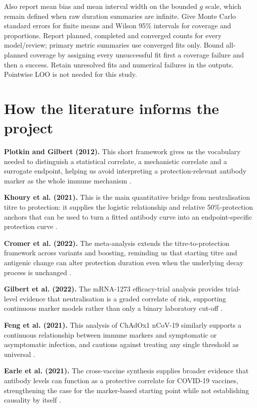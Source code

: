 \documentclass[11pt,a4paper]{article}
\begin{document}
Also report mean bias and mean interval width on the bounded $g$ scale,
which remain defined when raw duration summaries are infinite. Give Monte
Carlo standard errors for finite means and Wilson 95\% intervals for
coverage and proportions. Report planned, completed and converged counts
for every model/review; primary metric summaries use converged fits only.
Bound all-planned coverage by assigning every unsuccessful fit first a
coverage failure and then a success. Retain unresolved fits and numerical
failures in the outputs. Pointwise LOO is not needed for this study.

\section{How the literature informs the project}\label{sec:literature-guide}

\textbf{Plotkin and Gilbert (2012).} This short framework gives us the vocabulary needed to
distinguish a statistical correlate, a mechanistic correlate and a surrogate endpoint, helping us
avoid interpreting a protection-relevant antibody marker as the whole immune mechanism
\parencite{plotkin2012}.

\textbf{Khoury et al. (2021).} This is the main quantitative bridge from neutralisation titre to
protection: it supplies the logistic relationship and relative 50\%-protection anchors that can be
used to turn a fitted antibody curve into an endpoint-specific protection curve
\parencite{khoury2021}.

\textbf{Cromer et al. (2022).} The meta-analysis extends the titre-to-protection framework across
variants and boosting, reminding us that starting titre and antigenic change can alter protection
duration even when the underlying decay process is unchanged \parencite{cromer2022}.

\textbf{Gilbert et al. (2022).} The mRNA-1273 efficacy-trial analysis provides trial-level evidence
that neutralisation is a graded correlate of risk, supporting continuous marker models rather than
only a binary laboratory cut-off \parencite{gilbert2022}.

\textbf{Feng et al. (2021).} This analysis of ChAdOx1 nCoV-19 similarly supports a continuous
relationship between immune markers and symptomatic or asymptomatic infection, and cautions
against treating any single threshold as universal \parencite{feng2021}.

\textbf{Earle et al. (2021).} The cross-vaccine synthesis supplies broader evidence that antibody
levels can function as a protective correlate for COVID-19 vaccines, strengthening the case for
the marker-based starting point while not establishing causality by itself \parencite{earle2021}.
\end{document}
